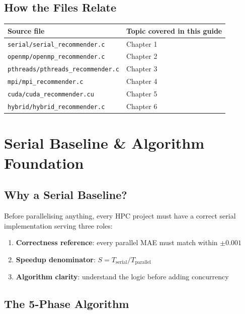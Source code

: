 \documentclass[12pt,a4paper]{report}
\begin{document}
\section*{How the Files Relate}

\begin{center}
\begin{tabular}{ll}
\toprule
Source file & Topic covered in this guide \\
\midrule
\texttt{serial/serial\_recommender.c} & Chapter 1 \\
\texttt{openmp/openmp\_recommender.c} & Chapter 2 \\
\texttt{pthreads/pthreads\_recommender.c} & Chapter 3 \\
\texttt{mpi/mpi\_recommender.c} & Chapter 4 \\
\texttt{cuda/cuda\_recommender.cu} & Chapter 5 \\
\texttt{hybrid/hybrid\_recommender.c} & Chapter 6 \\
\bottomrule
\end{tabular}
\end{center}

\chapter{Serial Baseline \& Algorithm Foundation}

\section{Why a Serial Baseline?}

Before parallelising anything, every HPC project must have a correct serial
implementation serving three roles:

\begin{enumerate}
    \item \textbf{Correctness reference}: every parallel MAE must match within $\pm 0.001$
    \item \textbf{Speedup denominator}: $S = T_{\text{serial}} / T_{\text{parallel}}$
    \item \textbf{Algorithm clarity}: understand the logic before adding concurrency
\end{enumerate}

\section{The 5-Phase Algorithm}
\end{document}
